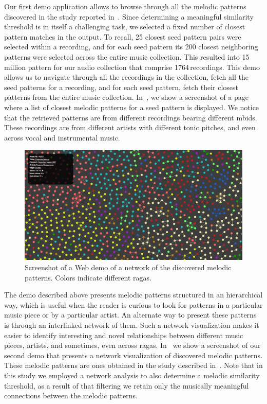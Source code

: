 Our first demo application allows to browse through all the melodic patterns discovered in the study reported in~\secref{}. Since determining a meaningful similarity threshold is in itself a challenging task, we selected a fixed number of closest pattern matches in the output. To recall, 25 closest seed pattern pairs were selected within a recording, and for each seed pattern its 200 closest neighboring patterns were selected  across the entire music collection. This resulted into 15\,million pattern for our audio collection that comprise 1764\,recordings. This demo allows us to navigate through all the recordings in the collection, fetch all the seed patterns for a recording, and for each seed pattern, fetch their closest patterns from the entire music collection. In~, we show a screenshot of a page where a list of closest melodic patterns for a seed pattern is displayed. We notice that the retrieved patterns are from different recordings bearing different \glspl{mbid}. These recordings are from different artists with different tonic pitches, and even across vocal and instrumental music. 

\begin{figure}
	\begin{center}
		\includegraphics[width=\figSizeHundred]{ch08_applications/figures/patternNetwork1.png}
	\end{center}
	\caption{Screenshot of a Web demo of a network of the discovered melodic patterns. Colors indicate different \glspl{raga}.}
	\label{fig:network_patterns}
\end{figure}

The demo described above presents melodic patterns structured in an hierarchical way, which is useful when the reader is curious to look for patterns in a particular music piece or by a particular artist. An alternate way to present these patterns is through an interlinked network of them. Such a network visualization makes it easier to identify interesting and novel relationships between different music pieces, artists, and sometimes, even across \glspl{raga}. In~ we show a screenshot of our second demo that presents a network visualization of discovered melodic patterns. These melodic patterns are ones obtained in the study described in~\secref{}. Note that in this study we employed a network analysis to also determine a melodic similarity threshold, as a result of that filtering we retain only the musically meaningful connections between the melodic patterns. 

